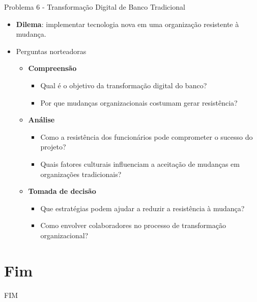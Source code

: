 \documentclass{beamer}
\begin{document}
\begin{frame}{Problema 6 - Transformação Digital de Banco Tradicional}
	\begin{itemize}
		\justifying
		\item \textbf{Dilema}: implementar tecnologia nova em uma organização resistente à mudança.
		\item Perguntas norteadoras
		\begin{itemize}
			\item \textbf{Compreensão}
			\begin{itemize}
				\justifying
				\item Qual é o objetivo da transformação digital do banco?
				\item Por que mudanças organizacionais costumam gerar resistência?
			\end{itemize}
			\item \textbf{Análise}
			\begin{itemize}
				\justifying
				\item Como a resistência dos funcionários pode comprometer o sucesso do projeto?
				\item Quais fatores culturais influenciam a aceitação de mudanças em organizações tradicionais?
			\end{itemize}
			\item \textbf{Tomada de decisão}
			\begin{itemize}
				\justifying
				\item Que estratégias podem ajudar a reduzir a resistência à mudança?
				\item Como envolver colaboradores no processo de transformação organizacional?
			\end{itemize}
		\end{itemize}
	\end{itemize}
\end{frame}

\section{Fim}

\begin{frame}
    \centering
    \Large
    FIM
\end{frame}
    
\end{document}
